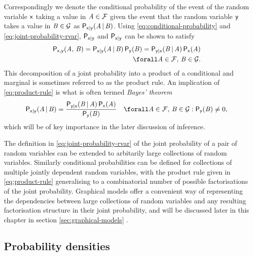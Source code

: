 Correspondingly we denote the conditional probability of the event of the random variable $\mathsf{x}$ taking a value in $\mathit{A} \in \mathcal{F}$ given the event that the random variable $\mathsf{y}$ takes a value in $\mathit{B} \in \mathcal{G}$ as $\mathsf{P}_{\mathsf{x}|\mathsf{y}}(\mathit{A}\operatorname{|}\mathit{B})$. Using \eqref{eq:conditional-probability} and \eqref{eq:joint-probability-rvar}, $\mathsf{P}_{\mathsf{x}|\mathsf{y}}$ and $\mathsf{P}_{\mathsf{x}|\mathsf{y}}$ can be shown to satisfy
\begin{equation}\label{eq:product-rule}
\begin{split}
  \prob{\rvar{x},\rvar{y}}(\set{A},\,\set{B}) =
  \prob{\rvar{x}|\rvar{y}}(\set{A} \gvn \set{B}) \, \prob{\rvar{y}}(\set{B}) =
  \prob{\rvar{y}|\rvar{x}}(\set{B} \gvn \set{A}) \, \prob{\rvar{x}}(\set{A})\\
  \forall \set{A} \in \sset{F},\,\set{B} \in \sset{G}.
\end{split}
\end{equation}
This decomposition of a joint probability into a product of a conditional and marginal is sometimes referred to as the product rule. An implication of \eqref{eq:product-rule} is what is often termed \emph{Bayes' theorem}
\begin{equation}\label{eq:bayes-theorem}
\begin{split}
  \prob{\rvar{x}|\rvar{y}}(\set{A} \gvn \set{B}) =
  \frac
    {\prob{\rvar{y}|\rvar{x}}(\set{B} \gvn \set{A}) \, \prob{\rvar{x}}(\set{A})}
    {\prob{\rvar{y}}(\set{B})} 
  \quad
  \forall \set{A} \in \sset{F},\,
  \set{B} \in \sset{G} : \prob{\rvar{y}}(\set{B}) \neq 0,
\end{split}
\end{equation}
which will be of key importance in the later discussion of inference.

The definition in \eqref{eq:joint-probability-rvar} of the joint probability of a pair of random variables can be extended to arbitarily large collections of random variables. Similarly conditional probabilities can be defined for collections of multiple jointly dependent random variables, with the product rule given in \eqref{eq:product-rule} generalising to a combinatorial number of possible factorisations of the joint probability. Graphical models offer a convenient way of representing the dependencies between large collections of random variables and any resulting factorisation structure in their joint probability, and will be discussed later in this chapter in section \ref{sec:graphical-models} .

\subsection{Probability densities}\label{subsec:probability-densities}

